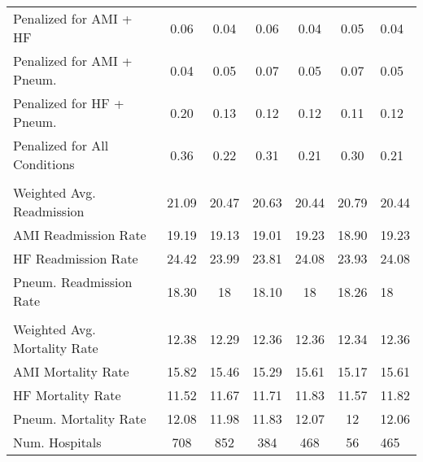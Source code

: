 \begin{table}[ht!]
\begin{tabular}[t]{lcccccl}
\hspace{1em}Penalized for AMI + HF & 0.06 & 0.04 & 0.06 & 0.04 & 0.05 & 0.04\\
\hspace{1em}Penalized for AMI + Pneum. & 0.04 & 0.05 & 0.07 & 0.05 & 0.07 & 0.05\\
\hspace{1em}Penalized for HF + Pneum. & 0.20 & 0.13 & 0.12 & 0.12 & 0.11 & 0.12\\
\hspace{1em}Penalized for All Conditions & 0.36 & 0.22 & 0.31 & 0.21 & 0.30 & 0.21\\
\addlinespace[0.3em]
\multicolumn{7}{l}{\textbf{Readmission Outcome Variables}}\\
\hspace{1em}Weighted Avg. Readmission & 21.09 & 20.47 & 20.63 & 20.44 & 20.79 & 20.44\\
\hspace{1em}AMI Readmission Rate & 19.19 & 19.13 & 19.01 & 19.23 & 18.90 & 19.23\\
\hspace{1em}HF Readmission Rate & 24.42 & 23.99 & 23.81 & 24.08 & 23.93 & 24.08\\
\hspace{1em}Pneum. Readmission Rate & 18.30 & 18 & 18.10 & 18 & 18.26 & 18\\
\addlinespace[0.3em]
\multicolumn{7}{l}{\textbf{Mortality Outcome Variables}}\\
\hspace{1em}Weighted Avg. Mortality Rate & 12.38 & 12.29 & 12.36 & 12.36 & 12.34 & 12.36\\
\hspace{1em}AMI Mortality Rate & 15.82 & 15.46 & 15.29 & 15.61 & 15.17 & 15.61\\
\hspace{1em}HF Mortality Rate & 11.52 & 11.67 & 11.71 & 11.83 & 11.57 & 11.82\\
\hspace{1em}Pneum. Mortality Rate & 12.08 & 11.98 & 11.83 & 12.07 & 12 & 12.06\\
\addlinespace[0.3em]
Num. Hospitals & 708 & 852 & 384 & 468 & 56 & 465\\
\bottomrule
\end{tabular}
\end{table}
